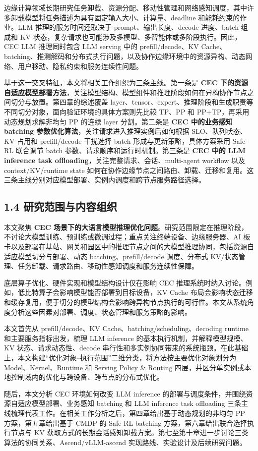 边缘计算领域长期研究任务卸载、资源分配、移动性管理和网络感知调度，其中许多卸载模型将任务描述为具有固定输入大小、计算量、deadline 和能耗约束的作业。LLM 推理的服务时间还取决于 prompt、输出长度、decode 进度、batch 组成和 KV 状态，复杂请求也可能涉及多模型、多智能体或多阶段执行。因此，CEC LLM 推理同时包含 LLM serving 中的 prefill/decode、KV Cache、batching、推测解码和分布式执行问题，以及协作边缘环境中的资源异构、动态网络、用户移动、隐私约束和服务连续性问题。

基于这一交叉特征，本文将相关工作组织为三条主线。第一条是 \textbf{CEC 下的资源自适应模型部署方法}，关注模型结构、模型组件和推理阶段如何在异构协作节点之间切分与放置。第四章的综述覆盖 layer、tensor、expert、推理阶段和生成职责等不同切分对象，面向验证环境的具体方案则先比较 TP、PP 和 PP+TP，再采用动态规划求解非均匀 PP 的连续 layer 分割。第二条是 \textbf{CEC 中的业务感知 batching 参数优化算法}，关注请求进入推理实例后如何根据 SLO、队列状态、KV 占用和 prefill/decode 干扰选择 batch 形成与更新策略，具体方案采用 Safe-RL 联合调节 batch 参数、请求顺序和运行时机制。第三条是 \textbf{CEC 中的 LLM inference task offloading}，关注完整请求、会话、multi-agent workflow 以及 context/KV/runtime state 如何在协作边缘节点之间路由、卸载、迁移和复用。这三条主线分别对应模型部署、实例内调度和跨节点服务路径选择。


\subsection*{1.4 研究范围与内容组织}

本文聚焦 \textbf{CEC 场景下的大语言模型推理优化问题}。研究范围限定在推理阶段，不讨论大模型训练、预训练或微调过程；重点关注终端设备、边缘服务器、AI 板卡以及部署在基站、网关和园区中的推理节点之间的大模型推理协同，包括资源自适应模型切分与部署、动态 batching、prefill/decode 调度、分布式 KV/状态管理、任务卸载、请求路由、移动性感知调度和服务连续性保障。


底层算子优化、硬件实现和模型结构设计仅在影响 CEC 推理系统时纳入讨论。例如，低比特算子会影响模型能否部署到目标设备，KV Cache 布局会影响状态迁移和缓存复用，便于切分的模型结构会影响跨异构节点执行的可行性。本文从系统角度分析这些因素对部署、调度、状态管理和服务策略的影响。

本文首先从 prefill/decode、KV Cache、batching/scheduling、decoding runtime 和主要服务指标出发，梳理 LLM inference 的基本执行机制，并解释模型规模、KV 状态、请求动态性、decode 串行性和多实例协同带来的系统瓶颈。在此基础上，本文构建“优化对象--执行范围”二维分类，将方法按主要优化对象划分为 Model、Kernel、Runtime 和 Serving Policy \& Routing 四层，并区分单实例或本地控制域内的优化与跨设备、跨节点的分布式优化。

随后，本文分析 CEC 环境如何改变 LLM inference 的部署与调度条件，并围绕资源自适应模型部署、业务感知 batching 和 LLM inference task offloading 三条主线梳理代表工作。在相关工作分析之后，第四章给出基于动态规划的非均匀 PP 方案，第五章给出基于 CMDP 的 Safe-RL batching 方案，第六章给出联合选择执行节点与 KV 获取方式的长期会话感知卸载方案。第七至第十章进一步讨论三类算法的协同关系、Ascend/vLLM-ascend 实现路线、实验设计及后续研究问题。
